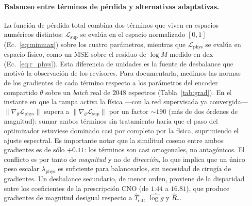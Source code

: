 \documentclass[sigconf,ACM]{acmart}
\begin{document}
\paragraph{Balanceo entre términos de pérdida y alternativas adaptativas.}
La función de pérdida total combina dos términos que viven en espacios numéricos distintos: $\mathcal{L}_\mathrm{sup}$ se evalúa en el espacio normalizado $[0,1]$ (Ec.~\ref{eq:minmax}) sobre los cuatro parámetros, mientras que $\mathcal{L}_\mathrm{phys}$ se evalúa en espacio físico, como un MSE sobre el residuo de $\log\dot{M}$ medido en dex (Ec.~\ref{eq:r_phys}). Esta diferencia de unidades es la fuente de desbalance que motivó la observación de los revisores. Para documentarla, medimos las normas de los gradientes de cada término respecto a los parámetros del encoder compartido $\theta$ sobre un \emph{batch} real de $2048$ espectros (Tabla~\ref{tab:grad}). En el instante en que la rampa activa la física ---con la red supervisada ya convergida--- $\lVert\nabla_\theta\mathcal{L}_\mathrm{phys}\rVert$ supera a $\lVert\nabla_\theta\mathcal{L}_\mathrm{sup}\rVert$ por un factor ${\sim}190$ (más de dos órdenes de magnitud): sumar ambos términos sin tratamiento haría que el paso del optimizador estuviese dominado casi por completo por la física, suprimiendo el ajuste espectral. Es importante notar que la similitud coseno entre ambos gradientes es de sólo $+0.11$: los términos son casi ortogonales, no antagónicos. El conflicto es por tanto de \emph{magnitud} y no de \emph{dirección}, lo que implica que un único peso escalar $\lambda_\mathrm{phys}$ es suficiente para balancearlos, sin necesidad de cirugía de gradientes. Un desbalance secundario, de menor orden, proviene de la disparidad entre los coeficientes de la prescripción CNO (de $1.44$ a $16.81$), que produce gradientes de magnitud desigual respecto a $\hat{T}_\mathrm{eff}$, $\widehat{\log g}$ y $\hat{R}_*$.
\end{document}
